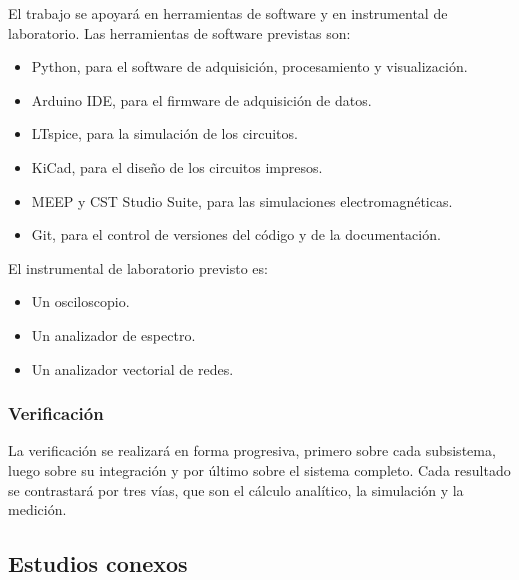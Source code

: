 \documentclass[11pt, a4paper, oneside]{article}
\begin{document}
El trabajo se apoyará en herramientas de software y en instrumental de
laboratorio. Las herramientas de software previstas son:
\begin{itemize}
  \item Python, para el software de adquisición, procesamiento y
        visualización.
  \item Arduino IDE, para el firmware de adquisición de datos.
  \item LTspice, para la simulación de los circuitos.
  \item KiCad, para el diseño de los circuitos impresos.
  \item MEEP y CST Studio Suite, para las simulaciones
        electromagnéticas.
  \item Git, para el control de versiones del código y de la
        documentación.
\end{itemize}

El instrumental de laboratorio previsto es:
\begin{itemize}
  \item Un osciloscopio.
  \item Un analizador de espectro.
  \item Un analizador vectorial de redes.
\end{itemize}

\subsubsection{Verificación}

La verificación se realizará en forma progresiva, primero sobre cada
subsistema, luego sobre su integración y por último sobre el sistema
completo. Cada resultado se contrastará por tres vías, que son el
cálculo analítico, la simulación y la medición.

\subsection{Estudios conexos}
\end{document}
